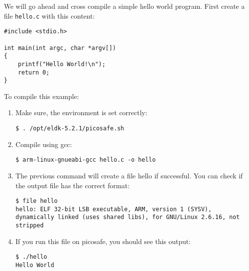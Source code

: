 We will go ahead and cross compile a simple hello world program. First create a
file \texttt{hello.c} with this content:

\begin{lstlisting}
#include <stdio.h> 

int main(int argc, char *argv[]) 
{ 
    printf("Hello World!\n"); 
    return 0; 
}
\end{lstlisting}

To compile this example:
\begin{enumerate}
\item Make sure, the environment is set correctly:

\texttt{\$ . /opt/eldk-5.2.1/picosafe.sh}
\item Compile using gcc:

\texttt{\$ arm-linux-gnueabi-gcc hello.c -o hello}
\item The previous command will create a file hello if successful. You can check if the output file has the correct format:

\texttt{\$ file hello} \\
\texttt{hello: ELF 32-bit LSB executable, ARM, version 1 (SYSV), dynamically linked (uses shared libs), for GNU/Linux 2.6.16, not stripped}
\item If you run this file on picosafe, you should see this output:

\texttt{\$ ./hello} \\
\texttt{Hello World}
\end{enumerate}
